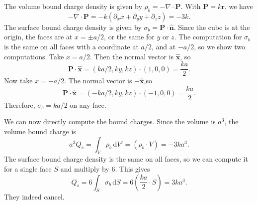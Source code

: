 \documentclass[11pt, letterpaper]{article}
\theoremstyle{plain}
\begin{document}
The volume bound charge density is given by $\rho _b = -\nabla \cdot \mathbf{P} $. With $\mathbf{P} =k \mathbf{r} $, we have
\[
	-\nabla \cdot \mathbf{P} =-k \left( \partial _xx+\partial _yy+\partial _zz \right) =-3k
.\]
The surface bound charge density is given by $\sigma _b=\mathbf{P} \cdot \mathbf{\hat{n} } $. Since the cube is at the origin, the faces are at $x=\pm a/2$, or the same for $y$ or $z$. The computation for $\sigma _b$ is the same on all faces with a coordinate at $a/2$, and at $-a/2$, so we show two computations. Take $x=a/2$. Then the normal vector is $\mathbf{\hat{x} } $, so
\[
	\mathbf{P} \cdot \mathbf{\hat{x} } =(ka/2,ky,kz)\cdot (1,0,0)=\frac{ka}{2} 
.\]
Now take $x=-a/2$. The normal vector is $-\mathbf{\hat{x} } $,so
\[
	\mathbf{P} \cdot \mathbf{\hat{x} } =(-ka/2,ky,kz)\cdot (-1,0,0)=\frac{ka}{2} 
.\]
Therefore, $\sigma _b=ka/2$ on any face.

We can now directly compute the bound charges. Since the volume is $a^3$, the volume bound charge is
\[
	a^3Q_v=\int_V \rho _b \,\mathrm{d} V'=(\rho _b\cdot V)=-3ka^3
.\]
The surface bound charge density is the same on all faces, so we can compute it for a single face $S$ and multiply by 6. This gives
\[
	Q_s = 6\int_{S} \sigma _b \,\mathrm{d} S=6\left( \frac{ka}{2} \cdot S \right) = 3ka^3
.\]
They indeed cancel.
\end{document}
